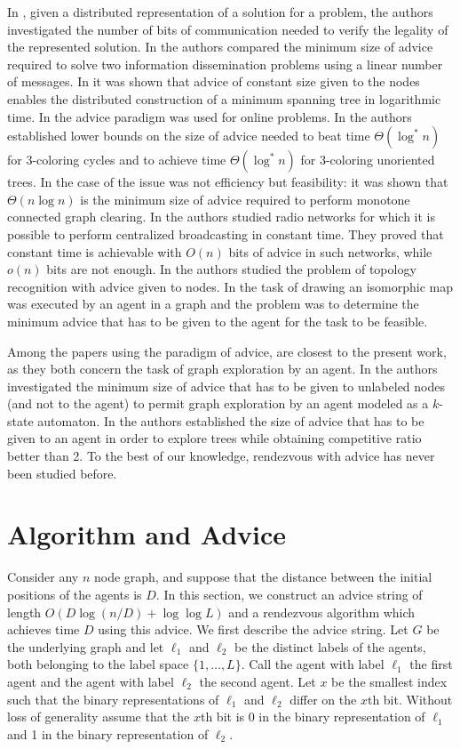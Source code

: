 \documentclass{llncs}
\begin{document}
 In \cite{KKP05}, given a distributed representation of a solution for a problem,
the authors investigated the number of bits of communication needed to verify the legality of the represented solution.
In \cite{FIP1} the authors compared the minimum size of advice required to
solve two information dissemination problems using a linear number of messages. 
In \cite{FKL} it was shown that advice of constant size given to the nodes enables the distributed construction of a minimum
spanning tree in logarithmic time. 
In \cite{EFKR} the advice paradigm was used for online problems.
In \cite{FGIP} the authors established lower bounds on the size of advice 
needed to beat time $\Theta(\log^*n)$
for 3-coloring cycles and to achieve time $\Theta(\log^*n)$ for 3-coloring unoriented trees.  
In the case of \cite{SN} the issue was not efficiency but feasibility: it
was shown that $\Theta(n\log n)$ is the minimum size of advice
required to perform monotone connected graph clearing.
In \cite{IKP} the authors studied radio networks for
which it is possible to perform centralized broadcasting in constant time. They proved that constant time is achievable with
$O(n)$ bits of advice in such networks, while
$o(n)$ bits are not enough. In \cite{FPR} the authors studied the problem of topology recognition with advice given to nodes. 
In \cite{DP} the task of drawing an isomorphic map was executed by an agent in a graph and the problem was to determine the minimum advice that has to be given to the agent
for the task to be feasible.

Among the papers using the paradigm of advice, \cite{CFIKP,FIP2} are closest to the present work, as they both concern the task of graph exploration by an agent.
In \cite{CFIKP} the authors investigated the minimum size of advice that has to be given to unlabeled nodes (and not to the agent)
to permit graph exploration by an agent modeled as a $k$-state automaton.
In \cite{FIP2} the authors
established the size of advice that has to be given to an agent in order to explore trees while obtaining 
competitive ratio better than 2.
To the best of our knowledge, rendezvous with advice has never been studied before.



\section{Algorithm and Advice}

Consider any $n$ node graph, and suppose that the distance between the initial positions of the agents is  $D$.
In this section, we construct an advice string of length $O(D\log(n/D)+\log\log L)$ and a rendezvous algorithm which achieves time $D$ using this advice.
We first describe the advice string. Let $G$ be the underlying graph and let $\ell_1$ and $\ell_2$ be the distinct labels of the agents, both belonging to the  label space $\{1,\dots,L\}$. Call the agent with label $\ell_1$ the first agent and the agent with label $\ell_2$ the second agent.
Let $x$ be the smallest index such that the binary representations of $\ell_1$ and $\ell_2$ differ on the $x$th bit. Without loss of generality assume that the $x$th bit is 0
in the binary representation of  $\ell_1$ and 1 in the  binary representation of $\ell_2$.
\end{document}
